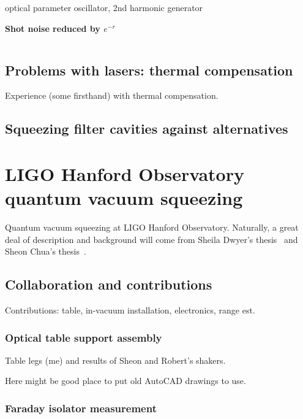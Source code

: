 optical parameter oscillator, 2nd harmonic generator


\textbf{Shot noise reduced by $e^{-r}$}


\[
\]




        \subsection{Problems with lasers: thermal compensation}
        \label{TCS}

            Experience (some firsthand) with thermal compensation.

        \subsection{Squeezing filter cavities against alternatives}
        \label{third-gen_squeezing}

    \section{LIGO Hanford Observatory quantum vacuum squeezing}
    \label{LHO_squeeze}

        Quantum vacuum squeezing at LIGO Hanford Observatory. Naturally, a great deal of description and background will come from Sheila Dwyer's thesis~\cite{DwyerThesis} and Sheon Chua's thesis~\cite{ChuaThesis}.

        \subsection{Collaboration and contributions}
        \label{contributions}

            Contributions: table, in-vacuum installation, electronics, range est.

            \subsubsection{Optical table support assembly}
            \label{table_legs}

                Table legs (me) and results of Sheon and Robert's shakers.

		Here might be good place to put old AutoCAD drawings to use.

            \subsubsection{Faraday isolator measurement}
            \label{Faraday}

